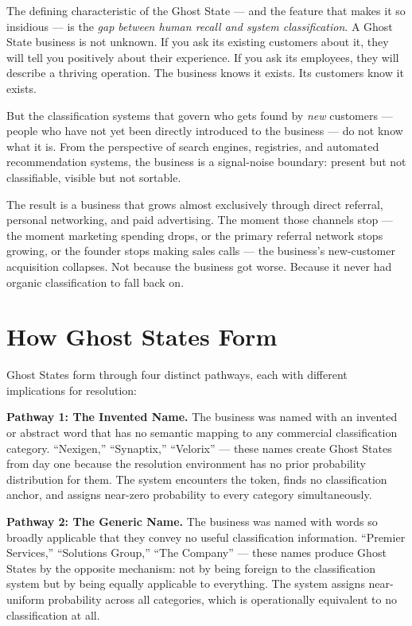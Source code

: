 \documentclass[12pt, openany]{book}
\theoremstyle{thmstyle}
\theoremstyle{defstyle}
\begin{document}
The defining characteristic of the Ghost State --- and the feature that makes it so insidious --- is the \textit{gap between human recall and system classification}. A Ghost State business is not unknown. If you ask its existing customers about it, they will tell you positively about their experience. If you ask its employees, they will describe a thriving operation. The business knows it exists. Its customers know it exists.

But the classification systems that govern who gets found by \textit{new} customers --- people who have not yet been directly introduced to the business --- do not know what it is. From the perspective of search engines, registries, and automated recommendation systems, the business is a signal-noise boundary: present but not classifiable, visible but not sortable.

The result is a business that grows almost exclusively through direct referral, personal networking, and paid advertising. The moment those channels stop --- the moment marketing spending drops, or the primary referral network stops growing, or the founder stops making sales calls --- the business's new-customer acquisition collapses. Not because the business got worse. Because it never had organic classification to fall back on.

\section{How Ghost States Form}

Ghost States form through four distinct pathways, each with different implications for resolution:

\textbf{Pathway 1: The Invented Name.}
The business was named with an invented or abstract word that has no semantic mapping to any commercial classification category. ``Nexigen,'' ``Synaptix,'' ``Velorix'' --- these names create Ghost States from day one because the resolution environment has no prior probability distribution for them. The system encounters the token, finds no classification anchor, and assigns near-zero probability to every category simultaneously.

\textbf{Pathway 2: The Generic Name.}
The business was named with words so broadly applicable that they convey no useful classification information. ``Premier Services,'' ``Solutions Group,'' ``The Company'' --- these names produce Ghost States by the opposite mechanism: not by being foreign to the classification system but by being equally applicable to everything. The system assigns near-uniform probability across all categories, which is operationally equivalent to no classification at all.
\end{document}
